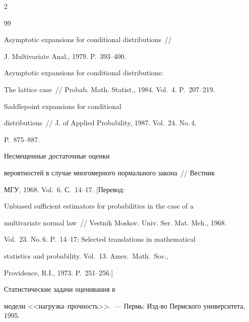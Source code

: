 \begin{multicols}{2}
{{\begin{thebibliography}{99}




Asymptotic expansions for conditional distributions~//


J. Multivariate Anal., 1979. P.~393--400.











Asymptotic expansions for conditional distributions:


The lattice case~// Probab. Math. Statist., 1984. Vol.~4. P.~207--219.









Saddlepoint expansions for conditional


distributions~// J. of Applied Probability, 1987. Vol.~24. No.\,4.


P.~875--887.











Несмещенные достаточные оценки


вероятностей в случае многомерного нормального закона~// Вестник


МГУ, 1968. Vol.~6. С.~14--17.  [Перевод: 




Unbiased sufficient estimators for probabilities in the case of a


multivariate normal law~// Vestnik Moskov. Univ. Ser. Mat. Meh., 1968.


Vol.~23. No.\,6. P.~14--17; Selected translations in mathematical


statistics and probability. Vol.~13. Amer.\ Math.\ Soc.,


Providence, R.I., 1973. P.~251--256.]








Статистические задачи оценивания в


модели <<нагрузка--прочность>>.~--- Пермь: Изд-во Пермского университета, 1995.



\end{thebibliography}}}
\end{multicols}
